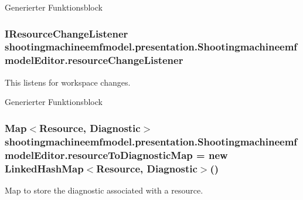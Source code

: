 Generierter Funktionsblock \hypertarget{classshootingmachineemfmodel_1_1presentation_1_1_shootingmachineemfmodel_editor_aaa557a702b66498b4b7780ba3c537050}{
\subsubsection[{resource\-Change\-Listener}]{\setlength{\rightskip}{0pt plus 5cm}I\-Resource\-Change\-Listener shootingmachineemfmodel.\-presentation.\-Shootingmachineemfmodel\-Editor.\-resource\-Change\-Listener\hspace{0.3cm}{\ttfamily [protected]}}}\label{classshootingmachineemfmodel_1_1presentation_1_1_shootingmachineemfmodel_editor_aaa557a702b66498b4b7780ba3c537050}
This listens for workspace changes.

Generierter Funktionsblock \hypertarget{classshootingmachineemfmodel_1_1presentation_1_1_shootingmachineemfmodel_editor_ae74ba645dc5dfd5d217c8b0a11d40dfb}{
\subsubsection[{resource\-To\-Diagnostic\-Map}]{\setlength{\rightskip}{0pt plus 5cm}Map$<$Resource, Diagnostic$>$ shootingmachineemfmodel.\-presentation.\-Shootingmachineemfmodel\-Editor.\-resource\-To\-Diagnostic\-Map = new Linked\-Hash\-Map$<$Resource, Diagnostic$>$()\hspace{0.3cm}{\ttfamily [protected]}}}\label{classshootingmachineemfmodel_1_1presentation_1_1_shootingmachineemfmodel_editor_ae74ba645dc5dfd5d217c8b0a11d40dfb}
Map to store the diagnostic associated with a resource.

